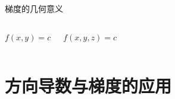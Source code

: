 \begin{frame}{梯度的几何意义}
\begin{columns}
\begin{center}
				$f(x,y)=c$\pause 
			\end{center}
			\begin{center}
				
				$f(x,y,z)=c$
			\end{center}
	\end{columns}	
\end{frame}

\section{方向导数与梯度的应用}

